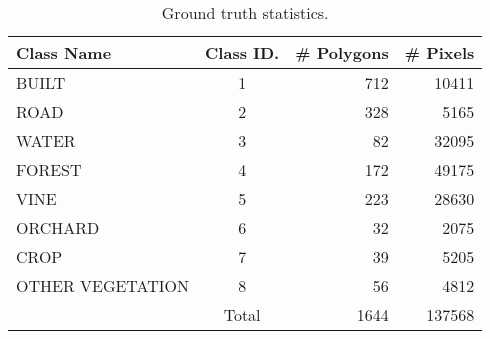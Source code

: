 \begin{table}[htb]
\centering
\scriptsize
\begin{tabular}{ |l|c|r|r| }
 \hline
 Class Name & Class ID. & \# Polygons & \# Pixels \\ 
 \hline
 BUILT & 1 & 712 & 10411\\
 ROAD & 2 & 328 & 5165 \\
 WATER & 3 & 82 & 32095 \\  
 FOREST & 4 & 172 & 49175 \\  
 VINE & 5 & 223 & 28630 \\
 ORCHARD & 6 & 32 & 2075 \\
 CROP & 7 & 39 & 5205 \\
 OTHER VEGETATION & 8 & 56 & 4812 \\
 \hline
 & Total & 1644 & 137568 \\
 \hline
\end{tabular}
\caption{Ground truth statistics.}
\label{tab:gt}
\end{table}